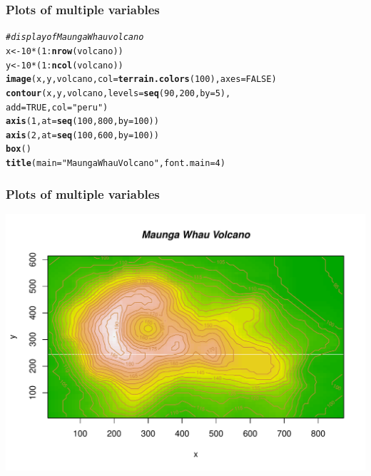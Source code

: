 \documentclass[12pt]{beamer}\usepackage[]{graphicx}\usepackage[]{color}
\makeatletter
\newcommand{\hlnum}[1]{\textcolor[rgb]{0.686,0.059,0.569}{#1}}%
\newcommand{\hlstr}[1]{\textcolor[rgb]{0.192,0.494,0.8}{#1}}%
\newcommand{\hlcom}[1]{\textcolor[rgb]{0.678,0.584,0.686}{\textit{#1}}}%
\newcommand{\hlopt}[1]{\textcolor[rgb]{0,0,0}{#1}}%
\newcommand{\hlstd}[1]{\textcolor[rgb]{0.345,0.345,0.345}{#1}}%
\newcommand{\hlkwb}[1]{\textcolor[rgb]{0.69,0.353,0.396}{#1}}%
\newcommand{\hlkwc}[1]{\textcolor[rgb]{0.333,0.667,0.333}{#1}}%
\newcommand{\hlkwd}[1]{\textcolor[rgb]{0.737,0.353,0.396}{\textbf{#1}}}%
\newenvironment{kframe}{%
 \def\at@end@of@kframe{}%
 \ifinner\ifhmode%
  \def\at@end@of@kframe{\end{minipage}}%
  \begin{minipage}{\columnwidth}%
 \fi\fi%
 \def\FrameCommand##1{\hskip\@totalleftmargin \hskip-\fboxsep
 \colorbox{shadecolor}{##1}\hskip-\fboxsep
     \hskip-\linewidth \hskip-\@totalleftmargin \hskip\columnwidth}%
 \MakeFramed {\advance\hsize-\width
   \@totalleftmargin\z@ \linewidth\hsize
   \@setminipage}}%
 {\par\unskip\endMakeFramed%
 \at@end@of@kframe}
\newenvironment{knitrout}{}{} %
\makeatother
\begin{document}
\begin{frame}[fragile]
\frametitle{Plots of multiple variables}
\begin{knitrout}\footnotesize
{}\color{fgcolor}\begin{kframe}
\begin{alltt}
\hlcom{# display of Maunga Whau volcano}
\hlstd{x} \hlkwb{<-} \hlnum{10}\hlopt{*}\hlstd{(}\hlnum{1}\hlopt{:}\hlkwd{nrow}\hlstd{(volcano))}
\hlstd{y} \hlkwb{<-} \hlnum{10}\hlopt{*}\hlstd{(}\hlnum{1}\hlopt{:}\hlkwd{ncol}\hlstd{(volcano))}
\hlkwd{image}\hlstd{(x, y, volcano,} \hlkwc{col} \hlstd{=} \hlkwd{terrain.colors}\hlstd{(}\hlnum{100}\hlstd{),} \hlkwc{axes} \hlstd{=} \hlnum{FALSE}\hlstd{)}
\hlkwd{contour}\hlstd{(x, y, volcano,} \hlkwc{levels} \hlstd{=} \hlkwd{seq}\hlstd{(}\hlnum{90}\hlstd{,} \hlnum{200}\hlstd{,} \hlkwc{by} \hlstd{=} \hlnum{5}\hlstd{),}
        \hlkwc{add} \hlstd{=} \hlnum{TRUE}\hlstd{,} \hlkwc{col} \hlstd{=} \hlstr{"peru"}\hlstd{)}
\hlkwd{axis}\hlstd{(}\hlnum{1}\hlstd{,} \hlkwc{at} \hlstd{=} \hlkwd{seq}\hlstd{(}\hlnum{100}\hlstd{,} \hlnum{800}\hlstd{,} \hlkwc{by} \hlstd{=} \hlnum{100}\hlstd{))}
\hlkwd{axis}\hlstd{(}\hlnum{2}\hlstd{,} \hlkwc{at} \hlstd{=} \hlkwd{seq}\hlstd{(}\hlnum{100}\hlstd{,} \hlnum{600}\hlstd{,} \hlkwc{by} \hlstd{=} \hlnum{100}\hlstd{))}
\hlkwd{box}\hlstd{()}
\hlkwd{title}\hlstd{(}\hlkwc{main} \hlstd{=} \hlstr{"Maunga Whau Volcano"}\hlstd{,} \hlkwc{font.main} \hlstd{=} \hlnum{4}\hlstd{)}
\end{alltt}
\end{kframe}
\end{knitrout}
\end{frame}


\begin{frame}[fragile]
\frametitle{Plots of multiple variables}
\begin{knitrout}\footnotesize
{}\color{fgcolor}

{\centering \includegraphics[width=.8\linewidth,height=.65\linewidth]{figure/volcano-1} 

}



\end{knitrout}
\end{frame}
\end{document}
